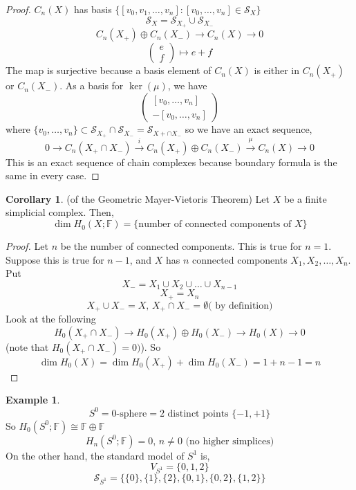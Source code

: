 \documentclass[a4paper,14pt]{extarticle}
\theoremstyle{definition}
\newtheorem*{corollary}{Corollary}
\newtheorem*{eg}{Example}
\begin{document}
\begin{proof}
	$C_n(X)$ has basis
	$\{[v_0,v_1,\ldots,v_n]:[v_0,\ldots,v_n]\in\mathcal{S}_X\}$
	\[\mathcal{S}_X=\mathcal{S}_{X_+}\cup \mathcal{S}_{X_-}\]
	\[C_n(X_+)\oplus C_n(X_-)\rightarrow C_n(X)\rightarrow 0\]
	\[\begin{pmatrix}
		e \\ f
	\end{pmatrix}\mapsto e+f\]
	The map is surjective because a basis element of $C_n(X)$ is either in 
	$C_n(X_+)$ or $C_n(X_-)$. As a basis for $\ker(\mu)$, we have
	\[\begin{pmatrix}
		[v_0,\ldots,v_n] \\ -[v_0,\ldots,v_n]
	\end{pmatrix}\] where $\{v_0,\ldots,v_n\}\subset
	\mathcal{S}_{X_+}\cap \mathcal{S}_{X_-}= \mathcal{S}_{X+\cap X_-}$
	so we have an exact sequence,
	\[0\rightarrow C_n(X_+\cap X_-)\xrightarrow{i} C_n(X_+)\oplus C_n(X_-)
	\xrightarrow{\mu} C_n(X)\rightarrow 0\]
	This is an exact sequence of chain complexes because boundary formula is 
	the same in every case.
\end{proof}

\begin{corollary}
	{(of the Geometric Mayer-Vietoris Theorem)}
	Let $X$ be a finite simplicial complex. Then,
	\[\dim H_0(X;\mathbb{F})=\{\text{number of connected components of $X$}\}\]
\end{corollary}

\begin{proof}
	Let $n$ be the number of connected components. This is true for $n=1$.
	Suppose this is true for $n-1$, and $X$ has $n$ connected components
	$X_1,X_2,\ldots, X_n$. Put \[X_-=X_1\cup X_2\cup\ldots\cup X_{n-1}\]
	\[X_+=X_n\] \[X_+\cup X_-=X, \,X_+\cap X_-=\emptyset
	\text{( by definition)}\]
	Look at the following
	\[H_0(X_+\cap X_-)\rightarrow H_0(X_+)\oplus H_0(X_-)\rightarrow H_0(X)
	\rightarrow 0\] (note that $H_0(X_+\cap X_-)=0)$). So 
	\[\dim H_0(X)=\dim H_0(X_+)+\dim H_0(X_-) = 1 + n-1 = n\]
\end{proof}

\begin{eg}
	\[S^0=0\text{-sphere}=2\text{ distinct points }\{-1,+1\}\]
	So $H_0(S^0;\mathbb{F})\cong \mathbb{F}\oplus \mathbb{F}$
	\[H_n(S^0;\mathbb{F})=0, \,n\neq0\text{ (no higher simplices)}\]
	On the other hand, the standard model of $S^1$ is,
	\[V_{S^1}=\{0,1,2\}\]
	\[\mathcal{S}_{S^1}=\{\{0\},\{1\},\{2\},\{0,1\},\{0,2\},\{1,2\}\}\]
\end{eg}
\end{document}
